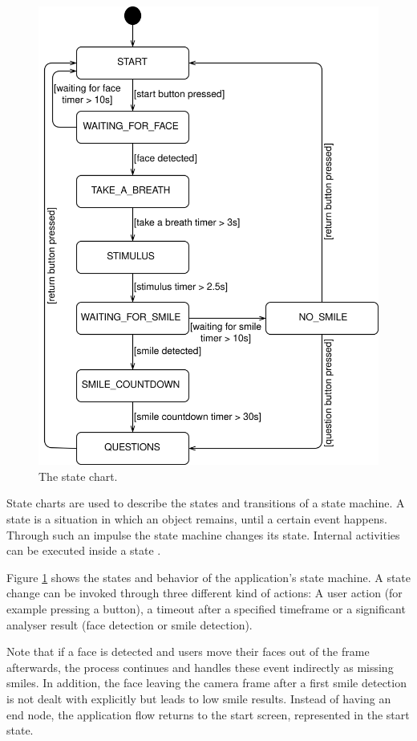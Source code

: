 \begin{figure}
  \includegraphics[width=\linewidth]{figures/state_chart.png}
  \caption{The state chart.}
  \label{fig:state_chart}
\end{figure}

State charts are used to describe the states and transitions of a state machine. A state is a situation in which an object remains, until a certain event happens. Through such an impulse the state machine changes its state. Internal activities can be executed inside a state \cite{Modeling_with_UML}.

Figure \ref{fig:state_chart} shows the states and behavior of the application's state machine.
A state change can be invoked through three different kind of actions: A user action (for example pressing a button), a timeout after a specified timeframe or a significant analyser result (face detection or smile detection).

Note that if a face is detected and users move their faces out of the frame afterwards, the process continues and handles these event indirectly as missing smiles.
In addition, the face leaving the camera frame after a first smile detection is not dealt with explicitly but leads to low smile results.
Instead of having an end node, the application flow returns to the start screen, represented in the start state.


